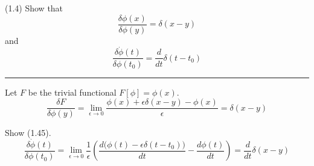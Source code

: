 \documentclass[12pt]{article}
\begin{document}
(1.4)
Show that
\begin{equation*}
\frac{\delta\phi(x)}{\delta\phi(y)}=\delta(x-y)
\tag{1.44}
\end{equation*}
and
\begin{equation*}
\frac{\delta\dot\phi(t)}{\delta\phi(t_0)}=\frac{d}{dt}\delta(t-t_0)
\tag{1.45}
\end{equation*}

\bigskip
\hrule

\bigskip
Let $F$ be the trivial functional $F[\phi]=\phi(x)$.
\begin{equation*}
\frac{\delta F}{\delta\phi(y)}
=\lim_{\epsilon\rightarrow0}
\frac{\phi(x)+\epsilon\delta(x-y)-\phi(x)}{\epsilon}
=\delta(x-y)
\end{equation*}

Show (1.45).
\begin{equation*}
\frac{\delta\dot\phi(t)}{\delta\phi(t_0)}
=\lim_{\epsilon\rightarrow0}\frac{1}{\epsilon}
\left(
\frac{d\big(\phi(t)-\epsilon\delta(t-t_0)\big)}{dt}-\frac{d\phi(t)}{dt}
\right)
=\frac{d}{dt}\delta(x-y)
\end{equation*}
\end{document}

